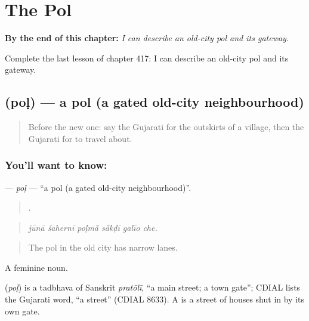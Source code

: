 
\chapter{The Pol}
\label{ch:gu-the-pol}

\begin{chapteropening}
\textbf{By the end of this chapter:} \emph{I can describe an old-city pol and its gateway.}

Complete the last lesson of chapter 417: I can describe an old-city pol and its gateway.
\end{chapteropening}

\section[\texorpdfstring{\gu{પોળ} (poḷ)}{પોળ (poḷ)}]{ (poḷ) — a pol (a gated old-city neighbourhood)}

\label{lesson:GU-C417-pol}



\begin{quote}
Before the new one: say the Gujarati for the outskirts of a village, then the Gujarati for to travel about.
\end{quote}

\subsection*{You'll want to know: }
\textbf{} — \emph{poḷ} — \textquotedblleft{}a pol (a gated old-city neighbourhood)\textquotedblright{}.

\begin{quote}
     .
\end{quote}

\begin{quote}
\emph{jūnā śahernī poḷmā̃ sā̃kḍī galīo che.}
\end{quote}

\begin{quote}
The pol in the old city has narrow lanes.
\end{quote}

A feminine noun.

\begin{cousinweb}
\textbf{} (\emph{poḷ}) is a tadbhava of Sanskrit \emph{pratōlī}, \textquotedblleft{}a main street; a town gate\textquotedblright{}; CDIAL lists the Gujarati word, \textquotedblleft{}a street\textquotedblright{} (CDIAL 8633). A  is a street of houses shut in by its own gate.
\end{cousinweb}

